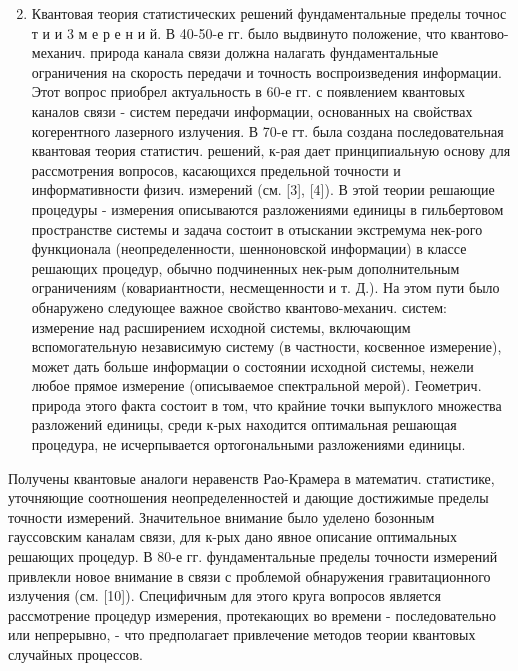\documentclass[10pt]{article}
\begin{document}
\begin{enumerate}

  \setcounter{enumi}{1}

  \item Квантовая теория статистических решений фундаментальные пределы точнос т и и 3 м е р е н и й. В 40-50-е гг. было выдвинуто положение, что квантово-механич. природа канала связи должна налагать фундаментальные ограничения на скорость передачи и точность воспроизведения информации. Этот вопрос приобрел актуальность в 60-е гг. с появлением квантовых каналов связи - систем передачи информации, основанных на свойствах когерентного лазерного излучения. В 70-е гт. была создана последовательная квантовая теория статистич. решений, к-рая дает принципиальную основу для рассмотрения вопросов, касающихся предельной точности и информативности физич. измерений (см. [3], [4]). В этой теории решающие процедуры - измерения описываются разложениями единицы в гильбертовом пространстве системы и задача состоит в отыскании экстремума нек-рого функционала (неопределенности, шенноновской информации) в классе решающих процедур, обычно подчиненных нек-рым дополнительным ограничениям (ковариантности, несмещенности и т. Д.). На этом пути было обнаружено следующее важное свойство квантово-механич. систем: измерение над расширением исходной системы, включающим вспомогательную независимую систему (в частности, косвенное измерение), может дать больше информации о состоянии исходной системы, нежели любое прямое измерение (описываемое спектральной мерой). Геометрич. природа этого факта состоит в том, что крайние точки выпуклого множества разложений единицы, среди к-рых находится оптимальная решающая процедура, не исчерпывается ортогональными разложениями единицы.

\end{enumerate}



Получены квантовые аналоги неравенств Рао-Крамера в математич. статистике, уточняющие соотношения неопределенностей и дающие достижимые пределы точности измерений. Значительное внимание было уделено бозонным гауссовским каналам связи, для к-рых дано явное описание оптимальных решающих процедур. В 80-е гг. фундаментальные пределы точности измерений привлекли новое внимание в связи с проблемой обнаружения гравитационного излучения (см. [10]). Специфичным для этого круга вопросов является рассмотрение процедур измерения, протекающих во времени - последовательно или непрерывно, - что предполагает привлечение методов теории квантовых случайных процессов.
\end{document}
